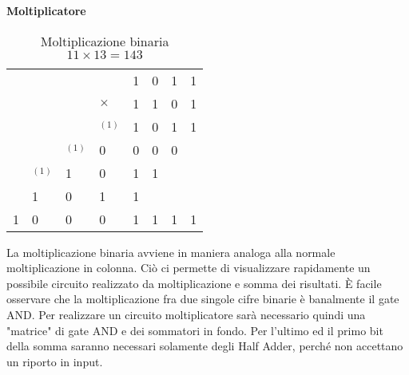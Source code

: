 \begin{defn}
	\textbf{Moltiplicatore} \\

\end{defn}

\begin{table}[H]
	\begin{tabular}{llllllll}
		&          &          &          & 1 & 0 & 1 & 1 \\
		&          &          & $\times$ & 1 & 1 & 0 & 1 \\ \cline{5-8} &
		&          & $^{(1)}$ & 1 & 0 & 1 & 1 \\
		&          & $^{(1)}$ & 0        & 0 & 0 & 0 &   \\
		& $^{(1)}$ & 1        & 0        & 1 & 1 &   &   \\
		& 1        & 0        & 1        & 1 &   &   &   \\ \cline{2-8} 1 & 0
		& 0        & 0        & 1 & 1 & 1 & 1
	\end{tabular}
	\caption{Moltiplicazione binaria $11 \times 13 = 143$}
	\label{tab:binmult}
\end{table}


La moltiplicazione binaria avviene in maniera analoga alla normale
moltiplicazione in colonna. Ciò ci permette di visualizzare rapidamente un
possibile circuito realizzato da moltiplicazione e somma dei risultati. È facile
osservare che la moltiplicazione fra due singole cifre binarie è banalmente il
gate AND. Per realizzare un circuito moltiplicatore sarà necessario quindi una
"matrice" di gate AND e dei sommatori in fondo. Per l'ultimo ed il primo bit
della somma saranno necessari solamente degli Half Adder, perché non accettano
un riporto in input.




